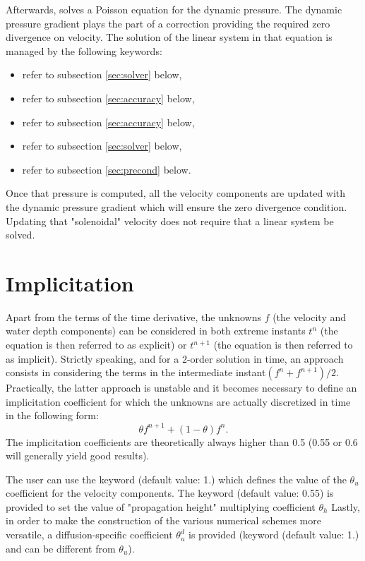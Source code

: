 Afterwards,  solves a Poisson equation for the dynamic pressure. The
dynamic pressure gradient plays the part of a correction providing the required
zero divergence on velocity. The solution of the linear system in that equation
is managed by the following keywords:

\begin{itemize}
\item {} refer to subsection \ref{sec:solver} below,

\item {} refer to subsection \ref{sec:accuracy}
below,

\item {} refer to subsection \ref{sec:accuracy} below,

\item {} refer to subsection \ref{sec:solver} below,

\item {} refer to subsection \ref{sec:precond} below.
\end{itemize}

Once that pressure is computed, all the velocity components are updated with
the dynamic pressure gradient which will ensure the zero divergence condition.
Updating that "solenoidal" velocity does not require that a linear system be
solved.

\section{Implicitation}

Apart from the terms of the time derivative, the unknowns $f$ (the velocity and
water depth components) can be considered in both extreme instants $t^{n}$ (the
equation is then referred to as explicit) or $t^{n+1}$ (the equation is then
referred to as implicit). Strictly speaking, and for a 2-order solution in
time, an approach consists in considering the terms in the intermediate
instant$(f^{n} +f^{n+1})/2$. Practically, the latter approach is unstable and
it becomes necessary to define an implicitation coefficient for which the
unknowns are actually discretized in time in the following form:
\[\theta f^{n+1} +(1-\theta )f^{n} .\]
The implicitation coefficients are theoretically always higher than 0.5 (0.55
or 0.6 will generally yield good results).

The user can use the keyword  (default
value: 1.) which defines the value of the $\theta_{u}$ coefficient for the
velocity components. The keyword  (default
value: 0.55) is provided to set the value of "propagation height" multiplying
coefficient $\theta_{h}$ Lastly, in order to make the construction of the
various numerical schemes more versatile, a diffusion-specific coefficient
$\theta_{u}^{d}$ is provided (keyword 
(default value: 1.) and can be different from $\theta_{u}$).


